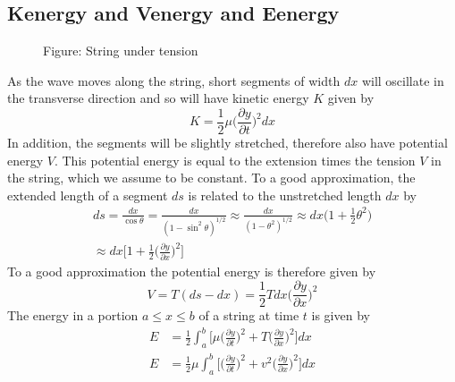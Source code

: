 \documentclass[../../../main.tex]{subfiles}
\begin{document}
\subsection*{Kenergy and Venergy and Eenergy} 
\begin{figure*}
    \centering
    \caption*{Figure: String under tension}
\end{figure*}
As the wave moves along the string, short segments of width $dx$ will oscillate in the transverse direction and so will have kinetic energy $K$ given by
\begin{equation*}
    K=\frac{1}{2}\mu \biggl(\frac{\partial y}{\partial t}\biggr)^2 dx 
\end{equation*}
In addition, the segments will be slightly stretched, therefore also have potential energy $V$. This potential energy is equal to the extension times the tension $V$ in the string, which we assume to be constant. To a good approximation, the extended length of a segment $ds$ is related to the unstretched length $dx$ by
\begin{multline*}
    ds=\frac{dx}{\cos \theta}=\frac{dx}{(1-\sin^2\theta)^{1/2}}\approx \frac{dx}{(1-\theta^2)^{1/2}} \approx dx\biggl(1+\frac{1}{2}\theta^2\biggr) \\
    \approx dx\biggl[1+\frac{1}{2}\biggl(\frac{\partial y}{\partial x}\biggr)^2\biggr]
\end{multline*}
To a good approximation the potential energy is therefore given by
\begin{equation*}
    V=T(ds-dx)=\frac{1}{2}Tdx \biggl(\frac{\partial y}{\partial x}\biggr)^2
\end{equation*}
The energy in a portion $a \leq x \leq b$ of a string at time $t$ is given by
\begin{align*}
    E&=\frac{1}{2}\int_{a}^{b}\biggl[\mu \biggl(\frac{\partial y}{\partial t}\biggr)^2 + T \biggl(\frac{\partial y}{\partial x}\biggr)^2\biggr]dx\\
    E&=\frac{1}{2}\mu\int_{a}^{b}\biggl[ \biggl(\frac{\partial y}{\partial t}\biggr)^2 + v^2 \biggl(\frac{\partial y}{\partial x}\biggr)^2\biggr]dx\\
\end{align*}
\end{document}
